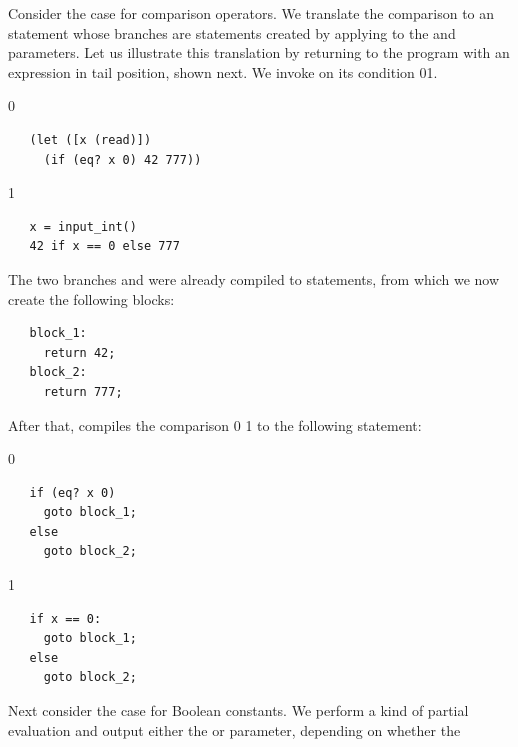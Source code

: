 \documentclass[7x10]{TimesAPriori_MIT}%
\def\racketEd{0}
\def\pythonEd{1}
\def\edition{1}
\newcommand{\racket}[1]{{\if\edition\racketEd{#1}\fi}}
\newcommand{\pythonColor}[0]{}
\newcommand{\python}[1]{{\if\edition\pythonEd\pythonColor #1\fi}}
\numberwithin{theorem}{chapter}
\numberwithin{definition}{chapter}
\numberwithin{equation}{chapter}
\begin{document}
Consider the case for comparison operators. We translate the
comparison to an  statement whose branches are 
statements created by applying  to the 
and  parameters. Let us illustrate this translation by
returning to the program with an  expression in tail
position, shown next. We invoke  on its
condition \racket{}\python{}.
%
{\if\edition\racketEd
\begin{lstlisting}
   (let ([x (read)])
     (if (eq? x 0) 42 777))
\end{lstlisting}
\fi}
%
{\if\edition\pythonEd\pythonColor
\begin{lstlisting}
   x = input_int()
   42 if x == 0 else 777
\end{lstlisting}
\fi}
%
\noindent The two branches  and  were already
compiled to  statements, from which we now create the
following blocks:
%
\begin{center}
\begin{minipage}{\textwidth}
\begin{lstlisting}
   block_1:
     return 42;
   block_2:
     return 777;
\end{lstlisting}
  \end{minipage}
\end{center}
%
After that,  compiles the comparison
\racket{}
\python{}
to the following  statement:
%
{\if\edition\racketEd
\begin{center}
\begin{minipage}{\textwidth}
\begin{lstlisting}
   if (eq? x 0)
     goto block_1;
   else
     goto block_2;
\end{lstlisting}
\end{minipage}
\end{center}
\fi}
{\if\edition\pythonEd\pythonColor
\begin{center}
\begin{minipage}{\textwidth}
\begin{lstlisting}
   if x == 0:
     goto block_1;
   else
     goto block_2;
\end{lstlisting}
\end{minipage}
\end{center}
\fi}
Next consider the case for Boolean constants. We perform a kind of
partial evaluation and output
either the  or  parameter, depending on whether the
\end{document}
